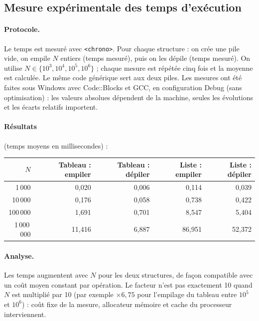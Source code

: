 \documentclass[11pt,a4paper]{article}
\begin{document}
\subsection{Mesure expérimentale des temps d'exécution}

\paragraph{Protocole.} Le temps est mesuré avec \texttt{<chrono>}. Pour chaque structure : on crée une pile vide, on empile $N$ entiers (temps mesuré), puis on les dépile (temps mesuré). On utilise $N \in \{10^3, 10^4, 10^5, 10^6\}$ ; chaque mesure est répétée cinq fois et la moyenne est calculée. Le même code générique sert aux deux piles. Les mesures ont été faites sous Windows avec Code\string:\string:Blocks et GCC, en configuration Debug (sans optimisation) : les valeurs absolues dépendent de la machine, seules les évolutions et les écarts relatifs importent.

\paragraph{Résultats} (temps moyens en millisecondes) :

\begin{center}
\renewcommand{\arraystretch}{1.2}
\begin{tabular}{@{}rrrrr@{}}
\toprule
$N$ & Tableau : empiler & Tableau : dépiler & Liste : empiler & Liste : dépiler \\
\midrule
1\,000     & 0,020  & 0,006 & 0,114  & 0,039 \\
10\,000    & 0,176  & 0,058 & 0,738  & 0,422 \\
100\,000   & 1,691  & 0,701 & 8,547  & 5,404 \\
1\,000\,000 & 11,416 & 6,887 & 86,951 & 52,372 \\
\bottomrule
\end{tabular}
\end{center}

\paragraph{Analyse.} Les temps augmentent avec $N$ pour les deux structures, de façon compatible avec un coût moyen constant par opération. Le facteur n'est pas exactement 10 quand $N$ est multiplié par 10 (par exemple $\times 6{,}75$ pour l'empilage du tableau entre $10^5$ et $10^6$) : coût fixe de la mesure, allocateur mémoire et cache du processeur interviennent.
\end{document}
